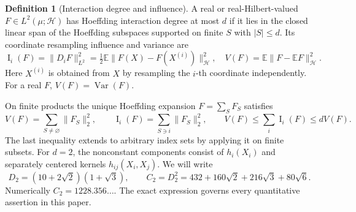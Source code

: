 \documentclass[11pt,letterpaper]{article}
\theoremstyle{definition}
\newtheorem{definition}[theorem]{Definition}
\newcommand{\E}{\mathbb E}
\newcommand{\Var}{\operatorname{Var}}
\newcommand{\Inf}{\operatorname{I}}
\newcommand{\cH}{\mathcal H}
\newcommand{\norm}[1]{\lVert #1\rVert}
\begin{document}
\begin{definition}[Interaction degree and influence]
A real or real-Hilbert-valued $F\in L^2(\mu;\cH)$ has Hoeffding interaction
degree at most $d$ if it lies in the closed linear span of the Hoeffding
subspaces supported on finite $S$ with $|S|\le d$. Its coordinate resampling
influence and variance are
\begin{equation}\label{eq:infdef}
\Inf_i(F)=\norm{D_iF}_{L^2}^2
 =\tfrac12\E\norm{F(X)-F(X^{(i)})}_{\cH}^2,\quad
V(F)=\E\norm{F-\E F}_{\cH}^2.
\end{equation}
Here $X^{(i)}$ is obtained from $X$ by resampling the $i$-th coordinate
independently. For a real $F$, $V(F)=\Var(F)$.
\end{definition}
On finite products the unique Hoeffding expansion $F=\sum_S F_S$ satisfies
\begin{equation}\label{eq:anova}
V(F)=\sum_{S\ne\varnothing}\norm{F_S}_2^2,\qquad
\Inf_i(F)=\sum_{S\ni i}\norm{F_S}_2^2,\qquad
V(F)\le\sum_i\Inf_i(F)\le dV(F).
\end{equation}
The last inequality extends to arbitrary index sets by applying it on
finite subsets. For $d=2$, the nonconstant components consist of $h_i(X_i)$
and separately centered kernels $h_{ij}(X_i,X_j)$. We will write
\begin{equation}\label{eq:constants}
D_2=(10+2\sqrt2)(1+\sqrt3),\qquad C_2=D_2^2
=432+160\sqrt2+216\sqrt3+80\sqrt6.
\end{equation}
Numerically $C_2=1228.356\ldots$. The exact expression governs every
quantitative assertion in this paper.
\end{document}
